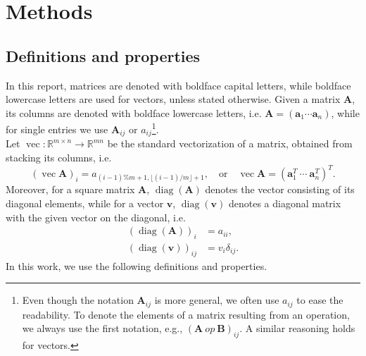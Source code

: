 \documentclass[10pt,titlepage]{article}
\numberwithin{equation}{section}
\numberwithin{figure}{section}
\newcommand{\floor}[1]{\lfloor #1 \rfloor}
\DeclareMathOperator{\myvec}{vec}
\DeclareMathOperator{\diag}{diag}
\begin{document}
\section{Methods}
\subsection{Definitions and properties}
In this report, matrices are denoted with boldface capital letters, while boldface lowercase letters are used for vectors, unless stated otherwise. Given a matrix $\mathbf{A}$, its columns are denoted with boldface lowercase letters, i.e. $\mathbf{A}=(\mathbf{a}_1 \cdots \mathbf{a}_n)$, while for single entries we use $\mathbf{A}_{ij}$ or $a_{ij}$\footnote{Even though the notation $\mathbf{A}_{ij}$ is more general, we often use $a_{ij}$ to ease the readability. To denote the elements of a matrix resulting from an operation, we always use the first notation, e.g., $(\mathbf{A} \ op \ \mathbf{B})_{ij}$. A similar reasoning holds for vectors.}. \\
Let ${ \myvec:\mathbb{R}^{m \times n} \rightarrow \mathbb{R}^{mn} }$ be the standard vectorization of a matrix, obtained from stacking its columns, i.e.
\begin{equation}
	(\myvec{\mathbf{A}})_i=a_{(i-1) \% m+1,\floor{(i-1)/m}+1}, \quad \text{or} \quad \myvec{\mathbf{A}}=(\mathbf{a}_1^T \ \cdots \ \mathbf{a}_n^T)^T.
\end{equation}
Moreover, for a square matrix $\mathbf{A}$, $\diag(\mathbf{A})$ denotes the vector consisting of its diagonal elements, while for a vector $\mathbf{v}$, $\diag(\mathbf{v})$ denotes a diagonal matrix with the given vector on the diagonal, i.e.
\begin{align}
	(\diag(\mathbf{A}))_i &= a_{ii}, \\
	(\diag(\mathbf{v}))_{ij} &= v_i \delta_{ij}.
\end{align}
In this work, we use the following definitions and properties.
\end{document}
